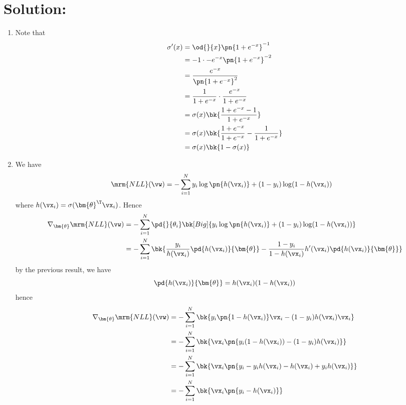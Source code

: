 \documentclass[189]{pset}
\begin{document}
  \section*{Solution:}
  \begin{enumerate}
    \item Note that
      \begin{align*}
        \sigma'(x)
        &= \od{}{x} \pn{1+e^{-x}}^{-1} \\
        &= -1\cdot -e^{-x} \pn{1+e^{-x}}^{-2} \\
        &= \frac{e^{-x}}{\pn{1+e^{-x}}^2} \\
        &= \frac{1}{1+e^{-x}} \cdot \frac{e^{-x}}{1 + e^{-x}} \\
        &= \sigma(x)\bk{\frac{1+e^{-x} - 1}{1+e^{-x}}} \\
        &= \sigma(x)\bk{\frac{1+e^{-x}}{1+e^{-x}} -
          \frac{1}{1+e^{-x}}} \\
        &= \sigma(x)\bk{1-\sigma(x)}
      \end{align*}
    \item We have
      \begin{align*}
        \mrm{NLL}(\vw)
        &= -\sum_{i=1}^N y_i \log\pn{h(\vx_i)} + (1-y_i)\log(1-
          h(\vx_i))
      \end{align*}
      where $h(\vx_i)=\sigma(\bm{\theta}^\T \vx_i)$. Hence
      \begin{align*}
        \nabla_{\bm{\theta}} \mrm{NLL}(\vw)
        &= -\sum_{i=1}^N \pd{}{\theta_i} \bk[Big]{ y_i
          \log\pn{h(\vx_i)} + (1-y_i)\log(1- h(\vx_i)) } \\
        &= -\sum_{i=1}^N\bk{\frac{y_i}{h(\vx_i)}\pd{h(\vx_i)}{
          \bm{\theta}} - \frac{1-y_i}{1- h(\vx_i)}h'(\vx_i)
          \pd{h(\vx_i)}{\bm{\theta}}}
      \end{align*}
      by the previous result, we have
      \[
        \pd{h(\vx_i)}{\bm{\theta}} = h(\vx_i)(1-h(\vx_i))
      \]
      hence
      \begin{align*}
        \nabla_{\bm{\theta}} \mrm{NLL}(\vw)
        &= -\sum_{i=1}^N \bk{y_i\pn{1-h(\vx_i)}\vx_i-(1-y_i)h(\vx_i)
          \vx_i} \\
        &= -\sum_{i=1}^N \bk{\vx_i \pn{y_i(1-h(\vx_i)) - (1-y_i)
          h(\vx_i)}} \\
        &= -\sum_{i=1}^N \bk{\vx_i\pn{y_i - y_ih(\vx_i) - h(\vx_i) +
          y_i h(\vx_i)}} \\
        &= -\sum_{i=1}^N \bk{\vx_i \pn{y_i - h(\vx_i)}} \\

\end{align*}
\end{enumerate}
\end{document}

